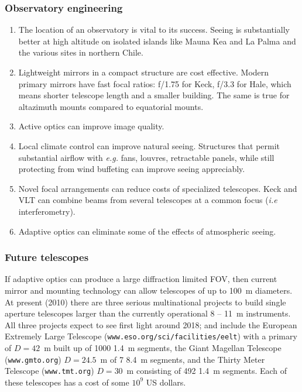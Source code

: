 \documentclass{article}
\begin{document}
\subsubsection{Observatory engineering}

\begin{enumerate}
\item The location of an observatory is vital to its success. Seeing is substantially better
at high altitude on isolated islands like Mauna Kea and La Palma and the various sites in 
northern Chile. 
\item Lightweight mirrors in a compact structure are cost effective. Modern primary mirrors
have fast focal ratios: f/1.75 for Keck, f/3.3 for Hale, which means shorter telescope length 
and a smaller building. The same is true for altazimuth mounts compared to equatorial mounts.
\item Active optics can improve image quality.
\item Local climate control can improve natural seeing. Structures that permit substantial
airflow with {\it e.g.} fans, louvres, retractable panels, while still protecting from 
wind buffeting can improve seeing appreciably.
\item Novel focal arrangements can reduce costs of specialized telescopes. Keck and VLT can 
combine beams from several telescopes at a common focus ({\it i.e} interferometry).
\item Adaptive optics can eliminate some of the effects of atmospheric seeing.
\end{enumerate}

\subsubsection{Future telescopes}

If adaptive optics can produce a large diffraction limited FOV, then current mirror and
mounting technology can allow telescopes of up to 100~m diameters. At present (2010)
there are three serious multinational projects to build single aperture telescopes larger 
than the currently operational 8 -- 11~m instruments. All three projects expect to see 
first light around 2018; and include the European Extremely Large Telescope 
({\tt www.eso.org/sci/facilities/eelt}) with a 
primary of $D=42$~m built up of 1000 1.4~m segments, the Giant Magellan Telescope
({\tt www.gmto.org})
$D=24.5$~m of 7 8.4~m segments, and the Thirty Meter Telescope 
({\tt www.tmt.org})
$D=30$~m consisting of 492 1.4~m segments. Each of these telescopes has a cost of
some $10^9$ US dollars.
\end{document}
